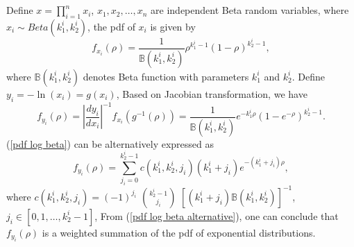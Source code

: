 \documentclass[12pt, draftclsnofoot, onecolumn]{IEEEtran}
\begin{document}
\section{}\label{proof pdf of OM}
Define $x=\prod_{i=1}^{n}x_{i}$,
$x_{1}, x_{2}, \ldots, x_{n}$ are independent Beta random variables, where $x_{i}\sim Beta(k_{1}^{i}, k_{2}^{i})$, the pdf of $x_{i}$ is given by 
\begin{equation}
f_{x_{i}}(\rho)=\frac{1}{\mathbb{B}(k_{1}^{i}, k_{2}^{i})}\rho^{k_{1}^{i}-1}(1-\rho)^{k_{2}^{i}-1},
\label{pdf beta}
\end{equation}
where $\mathbb{B}(k^{i}_{1}, k_{2}^{i})$ denotes Beta function with parameters $k_{1}^{i}$ and $k_{2}^{i}$.
Define $y_{i}=-\ln(x_{i})=g(x_{i})$, Based on Jacobian transformation, we have 
\begin{equation}
f_{y_{i}}(\rho)=|\frac{dy_{i}}{dx_{i}}|^{-1}f_{x_{i}}(g^{-1}(\rho))=\frac{1}{\mathbb{B}(k_{1}^{i},k_{2}^{i})}e^{-k_{1}^{i}\rho}(1-e^{-\rho})^{k_{2}^{i}-1}.
\label{pdf log beta}
\end{equation}
(\ref{pdf log beta}) can be alternatively expressed as \cite{bhargava1981distribution}
\begin{equation}
f_{y_{i}}(\rho)=\sum_{j_{i}=0}^{k_{2}^{i}-1}c(k_{1}^{i},k_{2}^{i}, j_{i})(k_{1}^{i}+j_{i})e^{-(k_{1}^{i}+j_{i})\rho},
\label{pdf log beta alternative}
\end{equation} 
where $c(k_{1}^{i}, k_{2}^{i}, j_{i})=(-1)^{j_{i}}$ $k_{2}^{i}-1\choose j_{i}$ $[(k_{1}^{i}+j_{i})\mathbb{B}(k_{1}^{i},k_{2}^{i})]^{-1}$, $j_{i}\in [0,1,\ldots, k_{2}^{i}-1]$,
From (\ref{pdf log beta alternative}), one can conclude that $f_{y_{i}}(\rho)$ is a weighted summation of the pdf of exponential distributions. 
\end{document}
